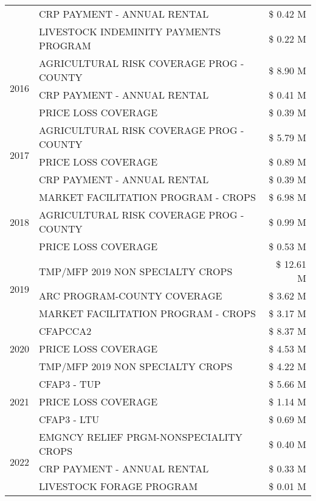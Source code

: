 \begin{tabular}{llr}
 & CRP PAYMENT - ANNUAL RENTAL & \$ 0.42 M \\
 & LIVESTOCK INDEMINITY PAYMENTS PROGRAM & \$ 0.22 M \\
\cline{1-3}
\multirow[t]{3}{*}{2016} & AGRICULTURAL RISK COVERAGE PROG - COUNTY & \$ 8.90 M \\
 & CRP PAYMENT - ANNUAL RENTAL & \$ 0.41 M \\
 & PRICE LOSS COVERAGE & \$ 0.39 M \\
\cline{1-3}
\multirow[t]{3}{*}{2017} & AGRICULTURAL RISK COVERAGE PROG - COUNTY & \$ 5.79 M \\
 & PRICE LOSS COVERAGE & \$ 0.89 M \\
 & CRP PAYMENT - ANNUAL RENTAL & \$ 0.39 M \\
\cline{1-3}
\multirow[t]{3}{*}{2018} & MARKET FACILITATION PROGRAM - CROPS & \$ 6.98 M \\
 & AGRICULTURAL RISK COVERAGE PROG - COUNTY & \$ 0.99 M \\
 & PRICE LOSS COVERAGE & \$ 0.53 M \\
\cline{1-3}
\multirow[t]{3}{*}{2019} & TMP/MFP 2019 NON SPECIALTY CROPS & \$ 12.61 M \\
 & ARC PROGRAM-COUNTY COVERAGE & \$ 3.62 M \\
 & MARKET FACILITATION PROGRAM - CROPS & \$ 3.17 M \\
\cline{1-3}
\multirow[t]{3}{*}{2020} & CFAPCCA2 & \$ 8.37 M \\
 & PRICE LOSS COVERAGE & \$ 4.53 M \\
 & TMP/MFP 2019 NON SPECIALTY CROPS & \$ 4.22 M \\
\cline{1-3}
\multirow[t]{3}{*}{2021} & CFAP3 - TUP & \$ 5.66 M \\
 & PRICE LOSS COVERAGE & \$ 1.14 M \\
 & CFAP3 - LTU & \$ 0.69 M \\
\cline{1-3}
\multirow[t]{3}{*}{2022} & EMGNCY RELIEF PRGM-NONSPECIALITY CROPS & \$ 0.40 M \\
 & CRP PAYMENT - ANNUAL RENTAL & \$ 0.33 M \\
 & LIVESTOCK FORAGE PROGRAM & \$ 0.01 M \\
\cline{1-3}
\bottomrule
\end{tabular}
